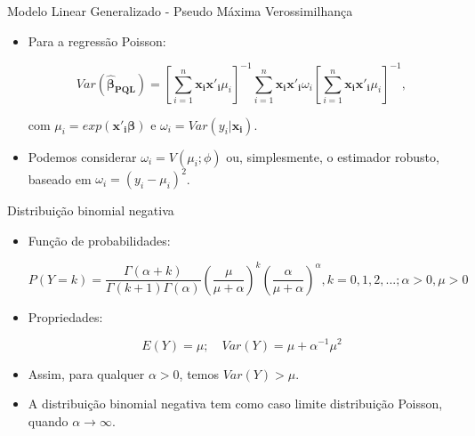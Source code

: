 \documentclass[10pt, aspectratio=169]{beamer}
\begin{document}


\begin{frame}{Modelo Linear Generalizado - Pseudo Máxima Verossimilhança} 

\begin{itemize}

\item Para a regressão Poisson:

$$
Var(\boldsymbol{\hat{\beta}_{PQL}})=\left [ \sum_{i=1}^{n} \boldsymbol{x_{i}x'_{i}}\mu_{i} \right ]^{-1}
\sum_{i=1}^{n} \boldsymbol{x_{i}x'_{i}} \omega_{i} \left [ \sum_{i=1}^{n} \boldsymbol{x_{i}x'_{i}}\mu_{i} \right ]^{-1},
$$

com $\mu_{i}=exp({\boldsymbol{x'_{i}\beta}})$ e $\omega_{i}=Var(y_{i}|\boldsymbol{x_{i}})$.

\vspace{0.5cm}

\item Podemos considerar $\omega_i=V(\mu_i;\phi)$ ou, simplesmente, o estimador robusto, baseado em $\omega_i=(y_i-\mu_i)^2$.


\end{itemize}

\end{frame}





\begin{frame}{Distribuição binomial negativa} 

\begin{itemize}

\item Função de probabilidades:

$$
P(Y=k)=\frac{\Gamma(\alpha+k)}{\Gamma(k+1)\Gamma(\alpha)}\left ( \frac{\mu}{\mu+\alpha} \right )^{k} \left( \frac{\alpha}{\mu+\alpha} \right )^{\alpha}, k=0,1,2,...; \alpha > 0, \mu>0
$$

\item Propriedades:

$$
E(Y)=\mu ; \quad Var(Y)= \mu+ \alpha^{-1} \mu^2
$$

\item Assim, para qualquer $\alpha>0$, temos $Var(Y)>\mu$.

\item A distribuição binomial negativa tem como caso limite distribuição Poisson, quando $\alpha \rightarrow \infty$.


\end{itemize}

\end{frame}
\end{document}

